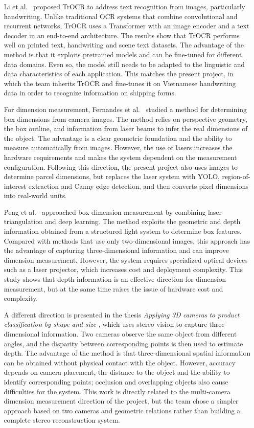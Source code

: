 Li et al.~\cite{li2023trocr} proposed TrOCR to address text recognition from images, particularly handwriting. Unlike traditional OCR systems that combine convolutional and recurrent networks, TrOCR uses a Transformer with an image encoder and a text decoder in an end-to-end architecture. The results show that TrOCR performs well on printed text, handwriting and scene text datasets. The advantage of the method is that it exploits pretrained models and can be fine-tuned for different data domains. Even so, the model still needs to be adapted to the linguistic and data characteristics of each application. This matches the present project, in which the team inherits TrOCR and fine-tunes it on Vietnamese handwriting data in order to recognize information on shipping forms.

For dimension measurement, Fernandes et al.~\cite{fernandes2006} studied a method for determining box dimensions from camera images. The method relies on perspective geometry, the box outline, and information from laser beams to infer the real dimensions of the object. The advantage is a clear geometric foundation and the ability to measure automatically from images. However, the use of lasers increases the hardware requirements and makes the system dependent on the measurement configuration. Following this direction, the present project also uses images to determine parcel dimensions, but replaces the laser system with YOLO, region-of-interest extraction and Canny edge detection, and then converts pixel dimensions into real-world units.

Peng et al.~\cite{peng2020} approached box dimension measurement by combining laser triangulation and deep learning. The method exploits the geometric and depth information obtained from a structured light system to determine box features. Compared with methods that use only two-dimensional images, this approach has the advantage of capturing three-dimensional information and can improve dimension measurement. However, the system requires specialized optical devices such as a laser projector, which increases cost and deployment complexity. This study shows that depth information is an effective direction for dimension measurement, but at the same time raises the issue of hardware cost and complexity.

A different direction is presented in the thesis \textit{Applying 3D cameras to product classification by shape and size} \cite{lethai2019}, which uses stereo vision to capture three-dimensional information. Two cameras observe the same object from different angles, and the disparity between corresponding points is then used to estimate depth. The advantage of the method is that three-dimensional spatial information can be obtained without physical contact with the object. However, accuracy depends on camera placement, the distance to the object and the ability to identify corresponding points; occlusion and overlapping objects also cause difficulties for the system. This work is directly related to the multi-camera dimension measurement direction of the project, but the team chose a simpler approach based on two cameras and geometric relations rather than building a complete stereo reconstruction system.

